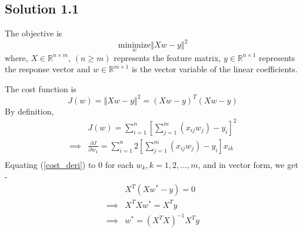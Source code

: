 \subsection*{Solution 1.1}
The objective is
\begin{equation}
	\underset{w}{\text{minimize}}\left\Vert Xw-y \right\Vert^2
\end{equation}
where, $X \in \mathbb{R}^{n \times m}$, $(n \geq m)$ represents the feature matrix, $y \in \mathbb{R}^{n \times 1}$ represents the response vector and $w \in \mathbb{R}^{m \times 1}$ is the vector variable of the linear coefficients.
\par
The cost function is
\begin{equation}
\label{cost_func}
	J(w) = \left\Vert Xw-y \right\Vert^2 = (Xw -y)^T(Xw -y)
\end{equation}
By definition,
\begin{equation}
\label{cost_deri}
	\begin{split}
					& J(w) = \sum_{i=1}^{n}\left[ \sum_{j=1}^{m}(x_{ij}w_j)-y_i \right]^2\\
		\implies 	& \frac{\partial J}{\partial w_k} = \sum_{i=1}^{n} 2 \left[ \sum_{j=1}^{m}(x_{ij}w_j)-y_i \right]x_{ik}\\
	\end{split}
\end{equation}
Equating (\ref{cost_deri}) to $0$ for each $w_k, k=1,2,\dots, m$, and in vector form, we get - 
\begin{equation}
	\begin{split}
					& X^T(Xw^* - y) = 0\\
		\implies	& X^TXw^* = X^Ty\\
		\implies	& w^* = (X^TX)^{-1}X^Ty\\
	\end{split}
\end{equation}